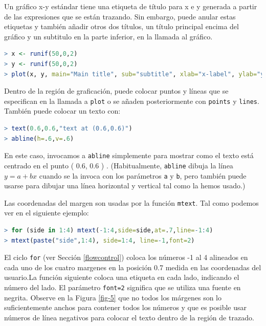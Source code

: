 Un gráfico x-y estándar tiene una etiqueta de título para x e y generada a
partir de las expresiones que se están trazando. Sin embargo, puede anular estas
etiquetas y también añadir otros dos títulos, un título principal encima del
gráfico y un subtitulo en la parte inferior, en la llamada al gráfico.

\begin{lstlisting}[language=R]
> x <- runif(50,0,2)
> y <- runif(50,0,2)
> plot(x, y, main="Main title", sub="subtitle", xlab="x-label", ylab="y-label")
\end{lstlisting}

Dentro de la región de graficación, puede colocar puntos y líneas que se especifican
en la llamada a \texttt{plot} o se añaden posteriormente con \texttt{points} y
\texttt{lines}. También puede colocar un texto con:

\begin{lstlisting}[language=R]
> text(0.6,0.6,"text at (0.6,0.6)")
> abline(h=.6,v=.6)
\end{lstlisting}

En este caso, invocamos a \texttt{abline} simplemente para mostrar como el
texto está centrado en el punto ( 0.6, 0.6 ) . (Habitualmente, \texttt{abline}
dibuja la línea $y = a + bx$ cuando se la invoca con los parámetros \texttt{a}
y \texttt{b}, pero también puede usarse para dibujar una línea horizontal y
vertical tal como la hemos usado.)

Las coordenadas del margen son usadas por la función \texttt{mtext}. Tal como
podemos ver en el siguiente ejemplo:

\begin{lstlisting}[language=R]
> for (side in 1:4) mtext(-1:4,side=side,at=.7,line=-1:4)
> mtext(paste("side",1:4), side=1:4, line=-1,font=2)
\end{lstlisting}

El ciclo \texttt{for} (ver Sección \ref{flowcontrol}) coloca los números -1 al 4
alineados en cada uno de los cuatro margenes en la posición 0.7 medida en las
coordenadas del usuario.La función siguiente coloca una etiqueta en cada lado,
indicando el número del lado. El parámetro \texttt{font=2} significa que se
utiliza una fuente en negrita. Observe en la Figura \ref{fig-5} que no todos los
márgenes son lo suficientemente anchos para contener todos los números y que es
posible usar números de línea negativos para colocar el texto dentro de la
región de trazado.

